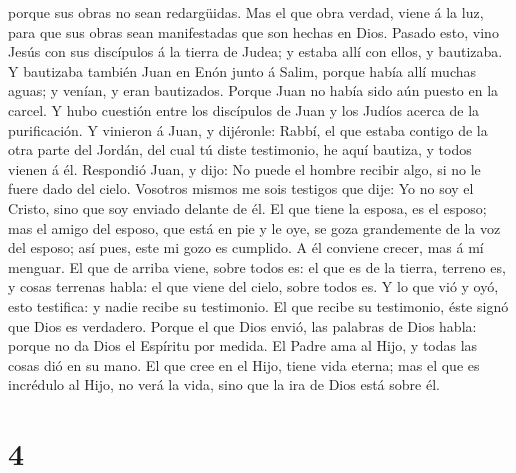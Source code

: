 porque sus obras no sean redargüidas.  Mas el que obra
verdad, viene á la luz, para que sus obras sean manifestadas que son
hechas en Dios.  Pasado esto, vino Jesús con sus discípulos
á la tierra de Judea; y estaba allí con ellos, y bautizaba.
 Y bautizaba también Juan en Enón junto á Salim, porque
había allí muchas aguas; y venían, y eran bautizados. 
Porque Juan no había sido aún puesto en la carcel.  Y hubo
cuestión entre los discípulos de Juan y los Judíos acerca de la
purificación.  Y vinieron á Juan, y dijéronle: Rabbí, el
que estaba contigo de la otra parte del Jordán, del cual tú diste
testimonio, he aquí bautiza, y todos vienen á él. 
Respondió Juan, y dijo: No puede el hombre recibir algo, si no le fuere
dado del cielo.  Vosotros mismos me sois testigos que dije:
Yo no soy el Cristo, sino que soy enviado delante de él. 
El que tiene la esposa, es el esposo; mas el amigo del esposo, que está
en pie y le oye, se goza grandemente de la voz del esposo; así pues,
este mi gozo es cumplido.  A él conviene crecer, mas á mí
menguar.  El que de arriba viene, sobre todos es: el que es
de la tierra, terreno es, y cosas terrenas habla: el que viene del
cielo, sobre todos es.  Y lo que vió y oyó, esto testifica:
y nadie recibe su testimonio.  El que recibe su testimonio,
éste signó que Dios es verdadero.  Porque el que Dios
envió, las palabras de Dios habla: porque no da Dios el Espíritu por
medida.  El Padre ama al Hijo, y todas las cosas dió en su
mano.  El que cree en el Hijo, tiene vida eterna; mas el
que es incrédulo al Hijo, no verá la vida, sino que la ira de Dios está
sobre él.

\hypertarget{section-3}{%
\section{4}\label{section-3}}

